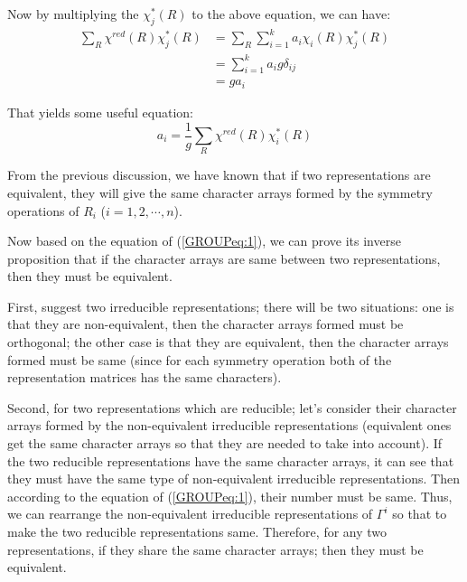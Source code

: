Now by multiplying the $\chi_{j}^{*}(R)$ to the above equation, we can
have:
\begin{align}\label{}
  \sum_{R}\chi^{red}(R)\chi_{j}^{*}(R) &=
  \sum_{R}\sum_{i=1}^{k}a_{i}\chi_{i}(R)\chi_{j}^{*}(R) \nonumber \\
  &=\sum_{i=1}^{k}a_{i}g\delta_{ij} \nonumber \\
  &= ga_{i}
\end{align}

That yields some useful equation:
\begin{equation}\label{GROUPeq:1}
  a_{i} = \frac{1}{g}\sum_{R}\chi^{red}(R)\chi_{i}^{*}(R)
\end{equation}

From the previous discussion, we have known that if two
representations are equivalent, they will give the same character
arrays formed by the symmetry operations of $R_{i}$ ($i=1,2,\cdots,
n$).

Now based on the equation of (\ref{GROUPeq:1}), we can prove its
inverse proposition that if the character arrays are same between two
representations, then they must be equivalent.

First, suggest two irreducible representations; there will be two
situations: one is that they are non-equivalent, then the character
arrays formed must be orthogonal; the other case is that they are
equivalent, then the character arrays formed must be same (since for
each symmetry operation both of the representation matrices has the
same characters).

Second, for two representations which are reducible; let's consider
their character arrays formed by the non-equivalent irreducible
representations (equivalent ones get the same character arrays so that
they are needed to take into account). If the two reducible
representations have the same character arrays, it can see that they
must have the same type of non-equivalent irreducible
representations. Then according to the equation of (\ref{GROUPeq:1}),
their number must be same. Thus, we can rearrange the non-equivalent
irreducible representations of $\Gamma^{i}$ so that to make the two
reducible representations same. Therefore, for any two
representations, if they share the same character arrays; then they
must be equivalent.

